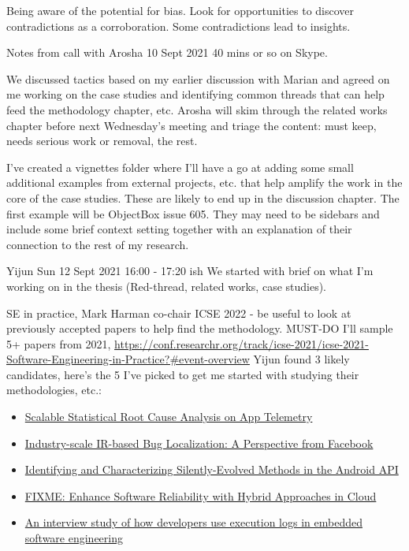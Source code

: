 Being aware of the potential for bias.
Look for opportunities to discover contradictions as a corroboration. 
Some contradictions lead to insights.

\hrulefill
Notes from call with Arosha 10 Sept 2021
40 mins or so on Skype.

We discussed tactics based on my earlier discussion with Marian and agreed on me working on the case studies and identifying common threads that can help feed the methodology chapter, etc. Arosha will skim through the related works chapter before next Wednesday's meeting and triage the content: must keep, needs serious work or removal, the rest.

I've created a vignettes folder where I'll have a go at adding some small additional examples from external projects, etc. that help amplify the work in the core of the case studies. These are likely to end up in the discussion chapter. The first example will be ObjectBox issue 605. They may need to be sidebars and include some brief context setting together with an explanation of their connection to the rest of my research.

\hfillrule
Yijun Sun 12 Sept 2021 16:00 - 17:20 ish
We started with brief on what I'm working on in the thesis (Red-thread, related works, case studies).

SE in practice, Mark Harman co-chair ICSE 2022 - be useful to look at previously accepted papers to help find the methodology. 
MUST-DO I'll sample 5+ papers from 2021, \url{https://conf.researchr.org/track/icse-2021/icse-2021-Software-Engineering-in-Practice?#event-overview} Yijun found 3 likely candidates, here's the 5 I've picked to get me started with studying their methodologies, etc.:
\begin{itemize}
    \item \href{https://arxiv.org/abs/2010.09974}{Scalable Statistical Root Cause Analysis on App Telemetry}
    \item \href{https://arxiv.org/abs/2010.09977}{Industry-scale IR-based Bug Localization: A Perspective from Facebook}
    \item \href{https://github.com/MobileSE/AndroSea/blob/main/paper/CompatibilityIssues.pdf}{Identifying and Characterizing Silently-Evolved Methods in the Android API}
    \item \href{http://arxiv.org/abs/2102.09336}{FIXME: Enhance Software Reliability with Hybrid Approaches in Cloud}
    \item \href{https://www.win.tue.nl/~aserebre/ICSE2021SEIP.pdf}{An interview study of how developers use execution logs in embedded software engineering}
\end{itemize}

